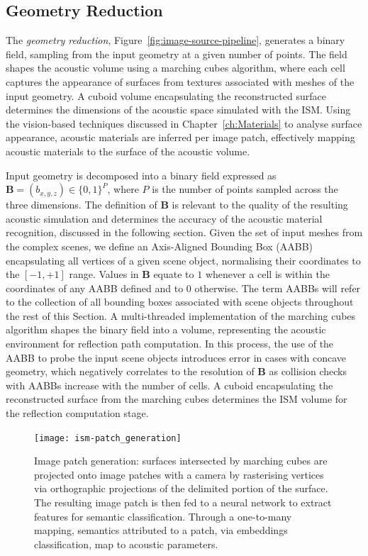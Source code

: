 \subsection{Geometry Reduction}
The \emph{geometry reduction}, Figure~\ref{fig:image-source-pipeline}, generates a binary field, sampling from the input geometry at a given number of points. The field shapes the acoustic volume using a marching cubes algorithm, where each cell captures the appearance of surfaces from textures associated with meshes of the input geometry. A cuboid volume encapsulating the reconstructed surface determines the dimensions of the acoustic space simulated with the ISM. Using the vision-based techniques discussed in Chapter~\ref{ch:Materials} to analyse surface appearance, acoustic materials are inferred per image patch, effectively mapping acoustic materials to the surface of the acoustic volume. \par
Input geometry is decomposed into a binary field expressed as $\mathbf{B} = (b_{x,y,z}) \in \{ 0, 1 \}^{P}$, where $P$ is the number of points sampled across the three dimensions. The definition of $\mathbf{B}$ is relevant to the quality of the resulting acoustic simulation and determines the accuracy of the acoustic material recognition, discussed in the following section. Given the set of input meshes from the complex scenes, we define an Axis-Aligned Bounding Box (AABB) encapsulating all vertices of a given scene object, normalising their coordinates to the $[-1, +1]$ range. Values in $\mathbf{B}$ equate to $1$ whenever a cell is within the coordinates of any AABB defined and to $0$ otherwise. The term AABBs will refer to the collection of all bounding boxes associated with scene objects throughout the rest of this Section. A multi-threaded implementation of the marching cubes algorithm \citep{bourke1994polygonising, lengyel2019foundations} shapes the binary field into a volume, representing the acoustic environment for reflection path computation. In this process, the use of the AABB to probe the input scene objects introduces error in cases with concave geometry, which negatively correlates to the resolution of $\mathbf{B}$ as collision checks with AABBs increase with the number of cells. A cuboid encapsulating the reconstructed surface from the marching cubes determines the ISM volume for the reflection computation stage. \par

\begin{figure}[htb]
 \centering 
 \texttt{[image: ism-patch\_generation]}
 \caption{Image patch generation: surfaces intersected by marching cubes are projected onto image patches with a camera by rasterising vertices via orthographic projections of the delimited portion of the surface. The resulting image patch is then fed to a neural network to extract features for semantic classification. Through a one-to-many mapping, semantics attributed to a patch, via embeddings classification, map to acoustic parameters.}
 \label{fig:ism-patch_generation}
\end{figure}

